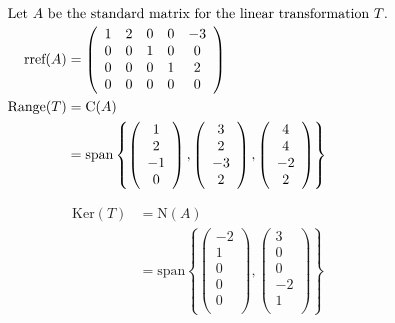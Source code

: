 \documentclass[12pt]{article}
\newenvironment{problem}[2][Problem]{\begin{trivlist}
\item[\hskip \labelsep {\bfseries #1}\hskip \labelsep {\bfseries #2.}]}{\end{trivlist}}
\begin{document}
\begin{problem}{4.a}
\end{problem}
\begin{align*}
\intertext{Let $A$ be the standard matrix for the linear transformation $T$.}
\text{rref}(A) &=
\left( \begin{array}{ccccc}
1 & 2 & 0 & 0 & -3\\
0 & 0 & 1 & 0 & 0\\
0 & 0 & 0 & 1 & 2\\
0 & 0 & 0 & 0 & 0\\
\end{array} \right)\\
\text{Range}(T) &= \text{C}(A)\\
&= \text{span} \left\{
\left( \begin{array}{c}
1\\
2\\
-1\\
0\\
\end{array} \right) ,
\left( \begin{array}{c}
3\\
2\\
-3\\
2\\
\end{array} \right) ,
\left( \begin{array}{c}
4\\
4\\
-2\\
2\\
\end{array} \right) 
\right\}\\
\end{align*}
\filbreak

\begin{problem}{4.b}
\end{problem}
\begin{align*}
\text{Ker}(T) &= \text{N}(A)\\
&= \text{span} \left\{
\left( \begin{array}{c}
-2\\
1\\
0\\
0\\
0\\
\end{array} \right) ,
\left( \begin{array}{c}
3\\
0\\
0\\
-2\\
1\\
\end{array} \right) 
\right\}\\
\end{align*}
\filbreak
\end{document}
